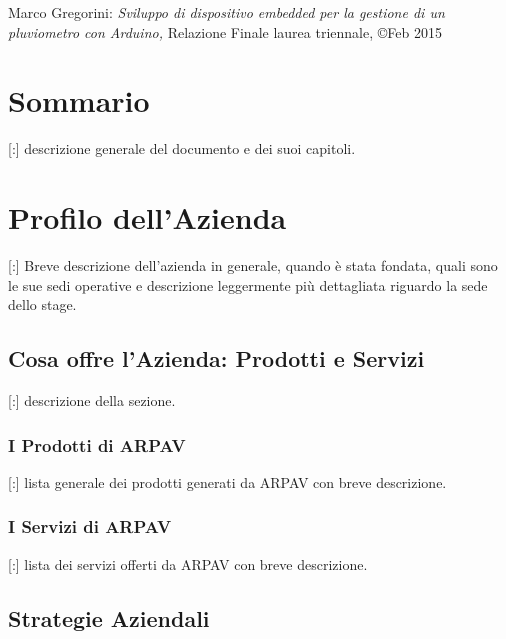 \documentclass[11pt]{book}              %
\begin{document}
\newpage
\thispagestyle{empty}
\vspace*{\fill}

Marco Gregorini: \textit{Sviluppo di dispositivo embedded per la gestione di un pluviometro con Arduino,} Relazione Finale laurea triennale, \copyright Feb 2015

\newpage




\chapter{Sommario}

[:] descrizione generale del documento e dei suoi capitoli.
                   

\newpage
\thispagestyle{empty}

\tableofcontents    

\newpage
\thispagestyle{empty}

                  
\mainmatter       
  

\chapter{Profilo dell'Azienda}

\thispagestyle{fancy} 

[:] Breve descrizione dell'azienda in generale, quando è stata fondata, quali sono le sue sedi operative e descrizione leggermente più dettagliata riguardo la sede dello stage.

\section{Cosa offre l'Azienda: Prodotti e Servizi}

[:] descrizione della sezione.

\subsection{I Prodotti di ARPAV}

[:] lista generale dei prodotti generati da ARPAV con breve descrizione.

\subsection{I Servizi di ARPAV}

[:] lista dei servizi offerti da ARPAV con breve descrizione.

\section{Strategie Aziendali}
\end{document}
